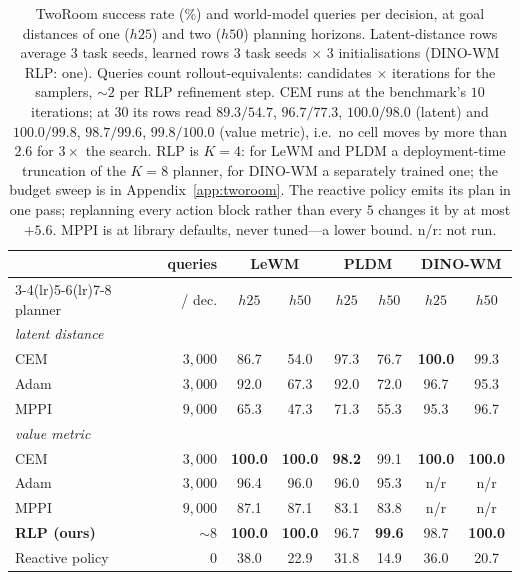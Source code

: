 \begin{table}[t]
\centering
\caption{TwoRoom success rate (\%) and world-model queries per decision, at
goal distances of one ($h25$) and two ($h50$) planning horizons. Latent-distance
rows average $3$ task seeds, learned rows $3$ task seeds $\times$ $3$
initialisations (DINO-WM RLP: one). Queries count rollout-equivalents:
candidates $\times$ iterations for the samplers, ${\sim}2$ per RLP refinement
step. CEM runs at the benchmark's $10$ iterations; at $30$ its rows read
$89.3/54.7$, $96.7/77.3$, $100.0/98.0$ (latent) and $100.0/99.8$, $98.7/99.6$,
$99.8/100.0$ (value metric), i.e.\ no cell moves by more than $2.6$ for
$3\times$ the search. RLP is $K{=}4$: for LeWM and PLDM a deployment-time
truncation of the $K{=}8$ planner, for DINO-WM a separately trained one; the
budget sweep is in Appendix~\ref{app:tworoom}. The reactive policy emits its
plan in one pass; replanning every action block rather than every $5$ changes it
by at most $+5.6$. MPPI is at library defaults, never tuned---a lower bound.
n/r: not run.}
\label{tab:tworoom}
\begin{tabular}{lrcccccc}
\toprule
& queries & \multicolumn{2}{c}{LeWM} & \multicolumn{2}{c}{PLDM} & \multicolumn{2}{c}{DINO-WM} \\
\cmidrule(lr){3-4}\cmidrule(lr){5-6}\cmidrule(lr){7-8}
planner & / dec. & $h25$ & $h50$ & $h25$ & $h50$ & $h25$ & $h50$ \\
\midrule
\multicolumn{8}{l}{\emph{latent distance}} \\
\quad CEM  & $3{,}000$ & 86.7 & 54.0 & 97.3 & 76.7 & \textbf{100.0} & 99.3 \\
\quad Adam & $3{,}000$ & 92.0 & 67.3 & 92.0 & 72.0 & 96.7 & 95.3 \\
\quad MPPI & $9{,}000$ & 65.3 & 47.3 & 71.3 & 55.3 & 95.3 & 96.7 \\
\midrule
\multicolumn{8}{l}{\emph{value metric}} \\
\quad CEM  & $3{,}000$ & \textbf{100.0} & \textbf{100.0} & \textbf{98.2} & 99.1 & \textbf{100.0} & \textbf{100.0} \\
\quad Adam & $3{,}000$ & 96.4 & 96.0 & 96.0 & 95.3 & n/r & n/r \\
\quad MPPI & $9{,}000$ & 87.1 & 87.1 & 83.1 & 83.8 & n/r & n/r \\
\quad \textbf{RLP (ours)} & ${\sim}8$ & \textbf{100.0} & \textbf{100.0} & 96.7 & \textbf{99.6} & 98.7 & \textbf{100.0} \\
\quad Reactive policy & $0$ & 38.0 & 22.9 & 31.8 & 14.9 & 36.0 & 20.7 \\
\bottomrule
\end{tabular}
\end{table}


